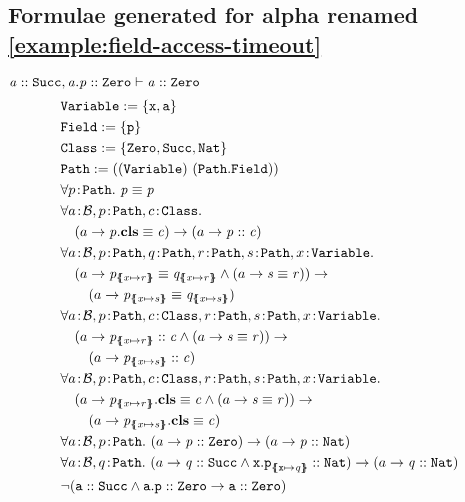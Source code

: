 \documentclass[a4paper]{article}
\begin{document}
\subsection{Formulae generated for alpha renamed \ref{example:field-access-timeout}}
$\mathit{a} :: \mathit{\mathtt{Succ}}, \mathit{a.p} :: \mathit{\mathtt{Zero}} \vdash \mathit{a} :: \mathit{\mathtt{Zero}}$
\begin{align}
  &\texttt{\Variable} := \{\mathtt{x}, \mathtt{a}\}\\
  &\texttt{\Field} := \{\mathtt{p}\}\\
  &\texttt{\Class} := \{\Zero,\Succ,\Nat\}\\
  &\Path := ((\Variable)~(\Path.\Field))\\
  &\forall \sortedVar{p}{\Path}.~\pathEq{p}{p}\\
  &\forall \sortedVar{a}{\TBool}, \sortedVar{p}{\Path}, \sortedVar{c}{\Class}.\\
  &\quad(a \rightarrow \instBy{p}{c}) \rightarrow (a \rightarrow \instOf{p}{c})\\
  &\forall \sortedVar{a}{\TBool}, \sortedVar{p}{\Path}, \sortedVar{q}{\Path}, \sortedVar{r}{\Path}, \sortedVar{s}{\Path}, \sortedVar{x}{\Variable}.\\
  &\quad (a \rightarrow \pathEq{p_{\sub{x}{r}}}{q_{\sub{x}{r}}} \land (a \rightarrow \pathEq{s}{r})) \rightarrow\\
  &\qquad (a \rightarrow \pathEq{p_{\sub{x}{s}}}{q_{\sub{x}{s}}})\\
  &\forall \sortedVar{a}{\TBool}, \sortedVar{p}{\Path}, \sortedVar{c}{\Class}, \sortedVar{r}{\Path}, \sortedVar{s}{\Path}, \sortedVar{x}{\Variable}.\\
  &\quad (a \rightarrow \instOf{p_{\sub{x}{r}}}{c} \land (a \rightarrow \pathEq{s}{r})) \rightarrow\\
  &\qquad (a \rightarrow \instOf{p_{\sub{x}{s}}}{c})\\
  &\forall \sortedVar{a}{\TBool}, \sortedVar{p}{\Path}, \sortedVar{c}{\Class}, \sortedVar{r}{\Path}, \sortedVar{s}{\Path}, \sortedVar{x}{\Variable}.\\
  &\quad (a \rightarrow \instBy{p_{\sub{x}{r}}}{c} \land (a \rightarrow \pathEq{s}{r})) \rightarrow\\
  &\qquad (a \rightarrow \instBy{p_{\sub{x}{s}}}{c})\\
  &\forall \sortedVar{a}{\TBool}, \sortedVar{p}{\Path}.~(a \rightarrow \instOf{p}{\Zero}) \rightarrow (a \rightarrow \instOf{p}{\Nat})\\
  &\forall \sortedVar{a}{\TBool}, \sortedVar{q}{\Path}.~(a \rightarrow \instOf{q}{\Succ} \land \instOf{\mathtt{x.p}_{\sub{\mathtt{x}}{q}}}{\Nat}) \rightarrow (a \rightarrow \instOf{q}{\Nat})\\
  & \neg (\instOf{\mathtt{a}}{\Succ} \land \instOf{\mathtt{a.p}}{\Zero} \rightarrow \instOf{\mathtt{a}}{\Zero})
\end{align}
\end{document}
